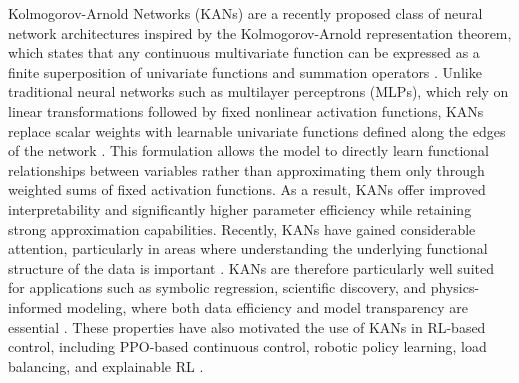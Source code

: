 \documentclass{article}
\begin{document}
Kolmogorov-Arnold Networks (KANs) are a recently proposed class of neural network architectures inspired by the Kolmogorov-Arnold representation theorem, which states that any continuous multivariate function can be expressed as a finite superposition of univariate functions and summation operators \cite{kolmogorov1956representation, arnold1963representation}.
Unlike traditional neural networks such as multilayer perceptrons (MLPs), which rely on linear transformations followed by fixed nonlinear activation functions, KANs replace scalar weights with learnable univariate functions defined along the edges of the network \cite{liu2024kan}.
This formulation allows the model to directly learn functional relationships between variables rather than approximating them only through weighted sums of fixed activation functions.
As a result, KANs offer improved interpretability and significantly higher parameter efficiency while retaining strong approximation capabilities.
Recently, KANs have gained considerable attention, particularly in areas where understanding the underlying functional structure of the data is important \cite{somvanshi2025survey,essahraui2025kanoverview,sohail2024training}.
KANs are therefore particularly well suited for applications such as symbolic regression, scientific discovery, and physics-informed modeling, where both data efficiency and model transparency are essential \cite{somvanshi2025survey,essahraui2025kanoverview}.
These properties have also motivated the use of KANs in RL-based control, including PPO-based continuous control, robotic policy learning, load balancing, and explainable RL \cite{kich2024online,bayeh2026kanppo,chen2025kanpolicy,singh2026loadbalancing,dalto2025explainable}.
\end{document}
